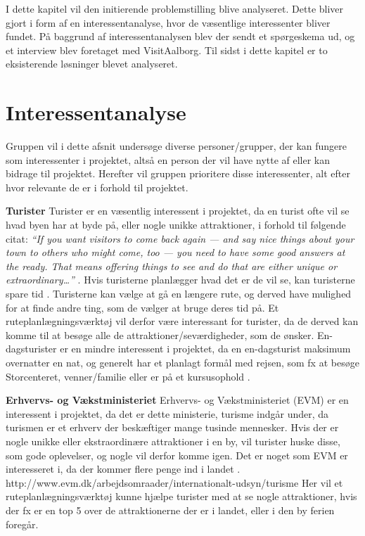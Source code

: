 I dette kapitel vil den initierende problemstilling blive analyseret. Dette bliver gjort i form af en interessentanalyse, hvor de væsentlige interessenter bliver fundet. På baggrund af interessentanalysen blev der sendt et spørgeskema ud, og et interview blev foretaget med VisitAalborg. Til sidst i dette kapitel er to eksisterende løsninger blevet analyseret. 

\section{Interessentanalyse}
Gruppen vil i dette afsnit undersøge diverse personer/grupper, der kan fungere som interessenter i projektet, altså en person der vil have nytte af eller kan bidrage til projektet. Herefter vil gruppen prioritere disse interessenter, alt efter hvor relevante de er i forhold til projektet.

\textbf{Turister}\newline
Turister er en væsentlig interessent i projektet, da en turist ofte vil se hvad byen har at byde på, eller nogle unikke attraktioner, i forhold til følgende citat: \newline 
\textit{“If you want visitors to come back again — and say nice things about your town to others who might come, too — you need to have some good answers at the ready. That means offering things to see and do that are either unique or extraordinary…”} \citep{UniversityOfMinnesota}.\newline 
Hvis turisterne planlægger hvad det er de vil se, kan turisterne spare tid \citep{YouthCentral}. Turisterne kan vælge at gå en længere rute, og derved have mulighed for at finde andre ting, som de vælger at bruge deres tid på. Et ruteplanlægningsværktøj vil derfor være interessant for turister, da de derved kan komme til at besøge alle de attraktioner/seværdigheder, som de ønsker.
En-dagsturister er en mindre interessent i projektet, da en en-dagsturist maksimum overnatter en nat, og generelt har et planlagt formål med rejsen, som fx at besøge Storcenteret, venner/familie eller er på et kursusophold \citep{Faxe}.

\textbf{Erhvervs- og Vækstministeriet}\newline
Erhvervs- og Vækstministeriet (EVM) er en interessent i projektet, da det er dette ministerie, turisme indgår under, da turismen er et erhverv der beskæftiger mange tusinde mennesker. Hvis der er nogle unikke eller ekstraordinære attraktioner i en by, vil turister huske disse, som gode oplevelser, og nogle vil derfor komme igen. Det er noget som EVM er interesseret i, da der kommer flere penge ind i landet \citep{EVM}.
http://www.evm.dk/arbejdsomraader/internationalt-udsyn/turisme
Her vil et ruteplanlægningsværktøj kunne hjælpe turister med at se nogle attraktioner, hvis der fx er en top 5 over de attraktionerne der er i landet, eller i den by ferien foregår.

